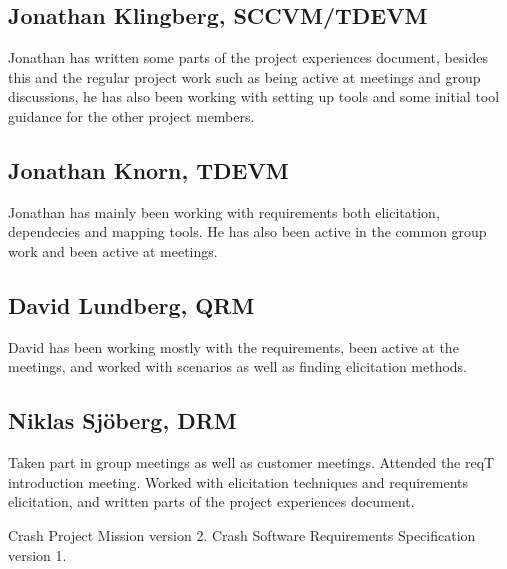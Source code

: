 \documentclass[10pt]{article}
\begin{document}
\subsection{Jonathan Klingberg, SCCVM/TDEVM}
Jonathan has written some parts of the project experiences document, besides this and the regular project work such as being active at meetings and group discussions, he has also been working with setting up tools and some initial tool guidance for the other project members.
\subsection{Jonathan Knorn, TDEVM}
Jonathan has mainly been working with requirements both elicitation, dependecies and mapping tools. He has also been active in the common group work and been active at meetings.
\subsection{David Lundberg, QRM}
David has been working mostly with the requirements, been active at the meetings, and worked with scenarios as well as finding elicitation methods.
\subsection{Niklas Sjöberg, DRM}
Taken part in group meetings as well as customer meetings. Attended the reqT introduction meeting. Worked with elicitation techniques and requirements elicitation, and written parts of the project experiences document. 

\begin{thebibliography}{1}
 Crash Project Mission version 2. 
 Crash Software Requirements Specification version 1. 

\end{thebibliography}
\end{document}

